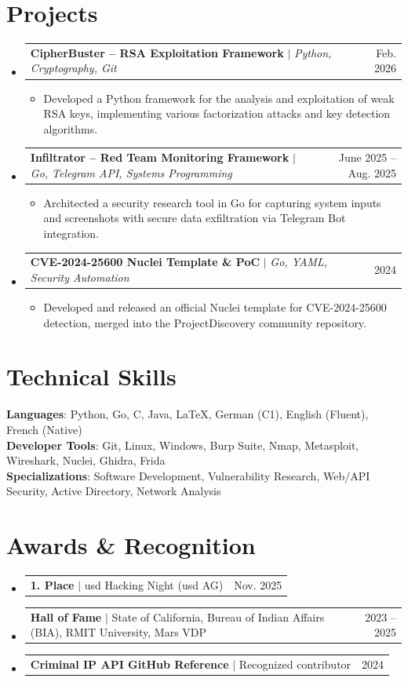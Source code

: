 \documentclass[letterpaper,11pt]{article}
\makeatletter
\newcommand{\resumeItem}[1]{
  \item\small{{#1 \vspace{-2pt}}}
}
\newcommand{\resumeProjectHeading}[2]{
    \item
    \begin{tabular*}{0.97\textwidth}{l@{\extracolsep{\fill}}r}
      \small#1 & #2 \\
    \end{tabular*}\vspace{-7pt}
}
\newcommand{\resumeSubHeadingListStart}{\begin{itemize}[leftmargin=0.15in, label={}]}
\newcommand{\resumeSubHeadingListEnd}{\end{itemize}}
\newcommand{\resumeItemListStart}{\begin{itemize}}
\newcommand{\resumeItemListEnd}{\end{itemize}\vspace{-5pt}}
\makeatother
\begin{document}
\section{Projects}
    \resumeSubHeadingListStart
      \resumeProjectHeading
          {\textbf{CipherBuster -- RSA Exploitation Framework} $|$ \emph{Python, Cryptography, Git}}{Feb. 2026}
          \resumeItemListStart
            \resumeItem{Developed a Python framework for the analysis and exploitation of weak RSA keys, implementing various factorization attacks and key detection algorithms.}
          \resumeItemListEnd
      \resumeProjectHeading
          {\textbf{Infiltrator -- Red Team Monitoring Framework} $|$ \emph{Go, Telegram API, Systems Programming}}{June 2025 -- Aug. 2025}
          \resumeItemListStart
            \resumeItem{Architected a security research tool in Go for capturing system inputs and screenshots with secure data exfiltration via Telegram Bot integration.}
          \resumeItemListEnd
      \resumeProjectHeading
          {\textbf{CVE-2024-25600 Nuclei Template \& PoC} $|$ \emph{Go, YAML, Security Automation}}{2024}
          \resumeItemListStart
            \resumeItem{Developed and released an official Nuclei template for CVE-2024-25600 detection, merged into the ProjectDiscovery community repository.}
          \resumeItemListEnd
    \resumeSubHeadingListEnd

\section{Technical Skills}
 \begin{itemize}[leftmargin=0.15in, label={}]
    \small{\item{
     \textbf{Languages}{: Python, Go, C, Java, LaTeX, German (C1), English (Fluent), French (Native)} \\
     \textbf{Developer Tools}{: Git, Linux, Windows, Burp Suite, Nmap, Metasploit, Wireshark, Nuclei, Ghidra, Frida} \\
     \textbf{Specializations}{: Software Development, Vulnerability Research, Web/API Security, Active Directory, Network Analysis}
    }}
 \end{itemize}

\section{Awards \& Recognition}
  \resumeSubHeadingListStart
    \resumeProjectHeading{\textbf{1. Place} $|$ usd Hacking Night (usd AG)}{Nov. 2025}
    \resumeProjectHeading{\textbf{Hall of Fame} $|$ State of California, Bureau of Indian Affairs (BIA), RMIT University, Mars VDP}{2023 -- 2025}
    \resumeProjectHeading{\textbf{Criminal IP API GitHub Reference} $|$ Recognized contributor}{2024}
  \resumeSubHeadingListEnd
\end{document}

